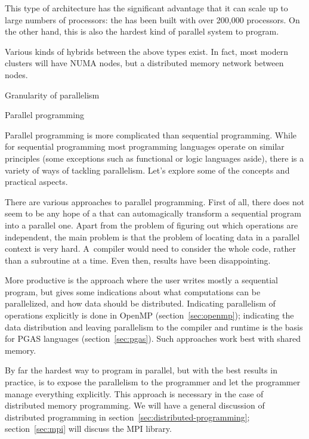 This type of architecture has the significant advantage that it can
scale up to large numbers of processors: the
 has been built with over 200,000
processors. On the other hand, this is also the hardest kind of
parallel system to program.

Various kinds of hybrids between the above types exist. In fact,
most modern clusters will have \ac{NUMA} nodes, but a distributed
memory network between nodes.

 {Granularity of parallelism}


 {Parallel programming}
\label{sec:parallel-programming}

Parallel programming is more complicated than sequential
programming. While for sequential programming most programming
languages operate on similar principles (some exceptions such as
functional or logic languages aside), there is a variety of ways of
tackling parallelism. Let's explore some of the concepts and practical
aspects.

There are various approaches to parallel programming. First of all,
there does not seem to be any hope of a
that can
automagically transform a sequential program into a parallel
one. Apart from the problem of figuring out which operations are
independent, the main
problem is that the problem of locating data in a parallel context is
very hard. A~compiler would need to consider the whole code, rather
than a subroutine at a time. Even then, results have been
disappointing.

More productive is the approach where the user writes mostly a
sequential program, but gives some indications about what computations
can be parallelized, and how data should be distributed. Indicating
parallelism of operations explicitly is done in OpenMP
(section~\ref{sec:openmp}); indicating the data distribution and
leaving parallelism to the compiler and runtime is the basis for PGAS
languages (section~\ref{sec:pgas}). Such approaches work best with
shared memory.

By far the hardest way to program in parallel, but with the best
results in practice, is to expose the parallelism to the programmer
and let the programmer manage everything explicitly. This approach is
necessary in the case of distributed memory programming. We will have
a general discussion of distributed programming in
section~\ref{sec:distributed-programming}; section~\ref{sec:mpi} will
discuss the MPI library.

